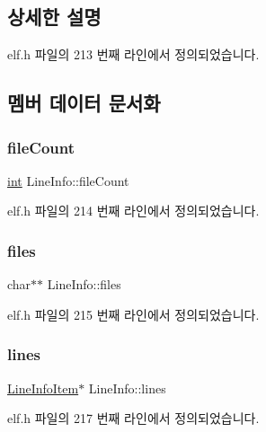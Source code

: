 \subsection{상세한 설명}


elf.\+h 파일의 213 번째 라인에서 정의되었습니다.



\subsection{멤버 데이터 문서화}
\mbox{\label{struct_line_info_a360dc53764f78411604eb10087a4218c}} 
\subsubsection{\texorpdfstring{file\+Count}{fileCount}}
{\footnotesize\ttfamily \mbox{\hyperlink{_util_8cpp_a0ef32aa8672df19503a49fab2d0c8071}{int}} Line\+Info\+::file\+Count}



elf.\+h 파일의 214 번째 라인에서 정의되었습니다.

\mbox{\label{struct_line_info_ac6a6675bb12eb9ae43556403a8f98f21}} 
\subsubsection{\texorpdfstring{files}{files}}
{\footnotesize\ttfamily char$\ast$$\ast$ Line\+Info\+::files}



elf.\+h 파일의 215 번째 라인에서 정의되었습니다.

\mbox{\label{struct_line_info_a774f0940e01fa7dd5a07dfa19acc81c6}} 
\subsubsection{\texorpdfstring{lines}{lines}}
{\footnotesize\ttfamily \mbox{\hyperlink{struct_line_info_item}{Line\+Info\+Item}}$\ast$ Line\+Info\+::lines}



elf.\+h 파일의 217 번째 라인에서 정의되었습니다.

